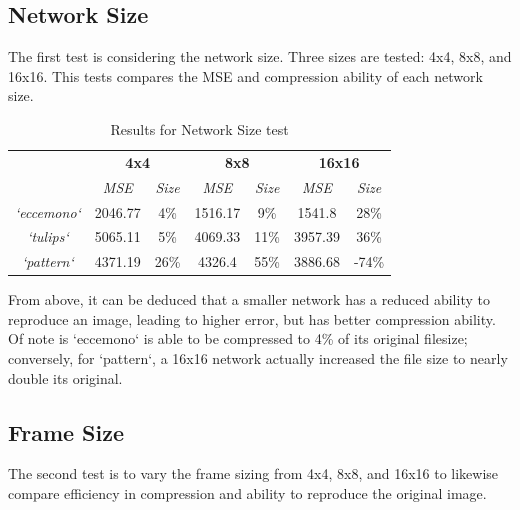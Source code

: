 \documentclass[a4paper,12pt]{article}
\begin{document}
\pagebreak

\subsection{Network Size}

The first test is considering the network size. Three sizes are tested: 4x4, 8x8, and 16x16. This tests compares the MSE and compression ability of each network size.

\begin{table}[h!]
\footnotesize
\centering
\begin{tabular}{c|c|c|c|c|c|c|}
\cline{2-7}
 & \multicolumn{2}{c|}{\textbf{4x4}} & \multicolumn{2}{c|}{\textbf{8x8}} & \multicolumn{2}{c|}{\textbf{16x16}} \\ \cline{2-7} 
 & \textit{MSE} & \textit{Size} & \textit{MSE} & \textit{Size} & \textit{MSE} & \textit{Size} \\ \hline
\multicolumn{1}{|c|}{\textit{`eccemono`}} & 2046.77 & 4\% & 1516.17 & 9\% & 1541.8 & 28\% \\ \hline
\multicolumn{1}{|c|}{\textit{`tulips`}} & 5065.11 & 5\% & 4069.33 & 11\% & 3957.39 & 36\% \\ \hline
\multicolumn{1}{|c|}{\textit{`pattern`}} & 4371.19 & 26\% & 4326.4 & 55\% & 3886.68 & -74\% \\ \hline
\end{tabular}
\caption{Results for Network Size test}
\end{table}

From above, it can be deduced that a smaller network has a reduced ability to reproduce an image, leading to higher error, but has better compression ability. Of note is `eccemono` is able to be compressed to 4\% of its original filesize; conversely, for `pattern`, a 16x16 network actually increased the file size to nearly double its original.

\subsection{Frame Size}

The second test is to vary the frame sizing from 4x4, 8x8, and 16x16 to likewise compare efficiency in compression and ability to reproduce the original image.
\end{document}
